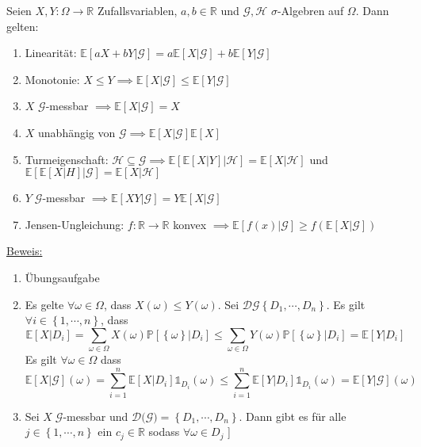 Seien $ X, Y : \Omega  \to \mathbb{R} $ Zufallsvariablen, $ a,b \in \mathbb{R} $ und $ \mathcal{G}, \mathcal{H}  $ $\sigma$-Algebren auf 
$ \Omega  $. Dann gelten:
\begin{enumerate}[label=\alph*)]
	\item Linearität: $ \mathbb{E} \left[ aX + bY | \mathcal{G} \right] = a \mathbb{E} \left[ X | \mathcal{G} \right] + b \mathbb{E} \left[ Y | \mathcal{G}\right] $ 
	\item Monotonie: $ X \leq Y \implies \mathbb{E} \left[ X | \mathcal{G} \right] \leq \mathbb{E} \left[ Y | \mathcal{G} \right] $ 
	\item $ X  $ $ \mathcal{G}$-messbar $ \implies \mathbb{E} \left[ X | \mathcal{G} \right] = X $  
	\item $ X $ unabhängig von $ \mathcal{G}  \implies \mathbb{E} \left[ X  | \mathcal{G} \right] \mathbb{E} \left[ X \right]$ 
	\item Turmeigenschaft: $ \mathcal{H} \subseteq \mathcal{G} \implies \mathbb{E} \left[ \mathbb{E} \left[ X | Y \right] | \mathcal{H} \right] = \mathbb{E} \left[ X | \mathcal{H} \right] $ und $ \mathbb{E} \left[ \mathbb{E} \left[ X | H \right]| \mathcal{G} \right] = \mathbb{E} \left[ X | \mathcal{H} \right] $ 
	\item $ Y \; \mathcal{G}$-messbar $ \implies \mathbb{E} \left[ X Y | \mathcal{G} \right] = Y \mathbb{E} \left[ X | \mathcal{G} \right] $
	\item Jensen-Ungleichung: $ f : \mathbb{R} \to \mathbb{R}  $ konvex $ \implies \mathbb{E} \left[ f (x) | \mathcal{G} \right] \geq 
		f \left( \mathbb{E} \left[ X | \mathcal{G} \right] \right)$ 
\end{enumerate}

\underline{Beweis:} \begin{enumerate}[label=\alph*)]
	\item Übungsaufgabe
	\item Es gelte $ \forall \omega  \in \Omega  $, dass $ X (\omega) \leq Y (\omega) $. Sei $ \mathcal{D} \mathcal{G} \left\{ D_1 , \cdots,  D_n \right\}$. Es gilt $ \forall i \in \left\{ 1 , \cdots,  n \right\} $, dass 
		$$ \mathbb{E} \left[ X | D_i \right] = \sum_{\omega  \in \Omega } X (\omega) \mathbb{P} \left[ \left\{ \omega  \right\} | D_i \right] \leq \sum_{\omega  \in \Omega } Y (\omega) \mathbb{P} \left[ \left\{ \omega  \right\} | D_i \right] = \mathbb{E} \left[ Y | D_i \right] $$
Es gilt $ \forall \omega  \in \Omega  $ dass
$$ \mathbb{E} \left[ X | \mathcal{G} \right] (\omega) = \sum_{i=1}^{n} \mathbb{E} \left[ X | D_i \right] \mathbb{1}_{D_i} (\omega) \leq \sum_{i=1}^{n} \mathbb{E} \left[ Y | D_i \right] \mathbb{1}_{D_i} (\omega) = \mathbb{E} \left[ Y | \mathcal{G} \right] (\omega)$$
\item Sei $ X \; \mathcal{G}$-messbar und $ \mathcal{D} ( \mathcal{G)} = \left\{ D_1 , \cdots,  D_n \right\} $. Dann gibt es für alle 
	$ j \in \left\{ 1 , \cdots,  n \right\} $ ein $ c_j \in \mathbb{R} $ sodass $ \forall \omega  \in D_j $ ]



		
\end{enumerate}


